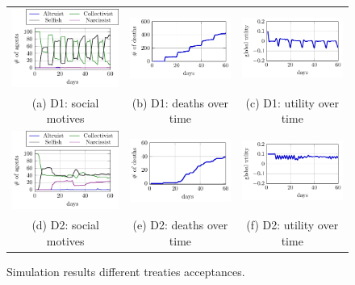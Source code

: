 \begin{figure}[H]
    \centering
    \begin{tabular}{ccc}
    \includegraphics[width=0.3\linewidth]{008_team_6_agent_design/D/D1_SM.pdf} &   \includegraphics[width=0.3\linewidth]{008_team_6_agent_design/D/D1_deaths.pdf} &
    \includegraphics[width=0.3\linewidth]{008_team_6_agent_design/D/D1_utility.pdf}\\[0pt]
    (a) D1: social motives & (b) D1: deaths over time & (c) D1: utility over time \\[8pt]
    \includegraphics[width=0.3\linewidth]{008_team_6_agent_design/D/D3_SM.pdf} &   \includegraphics[width=0.3\linewidth]{008_team_6_agent_design/D/D3_deaths.pdf} &
    \includegraphics[width=0.3\linewidth]{008_team_6_agent_design/D/D3_utility.pdf}\\[0pt]
    (d) D2: social motives & (e) D2: deaths over time & (f) D2: utility over time \\[8pt]
    \end{tabular}
    \caption{Simulation results different treaties acceptances.}
    \label{fig:res_D}%
\end{figure}

